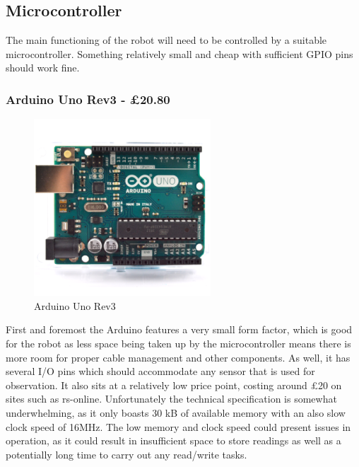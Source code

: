 				\subsection{Microcontroller}
				The main functioning of the robot will need to be controlled by a suitable microcontroller. Something relatively small and cheap with sufficient GPIO pins should work fine.
				
					\subsubsection{Arduino Uno Rev3 - \pounds{20.80}}
					\begin{figure}[h]
						\centering
						\includegraphics[width=.3\linewidth]{ANALYSIS/arduinounorev3.png}
						\caption{Arduino Uno Rev3}
						\label{fig:arduinounorev3}
					\end{figure}
					First and foremost the Arduino features a very small form factor, which is good for the robot as less space being taken up by the microcontroller means there is more room for proper cable management and other components. As well, it has several I/O pins which should accommodate any sensor that is used for observation. It also sits at a relatively low price point, costing around \pounds{20} on sites such as rs-online\cite{arduinounorev3}. Unfortunately the technical specification is somewhat underwhelming, as it only boasts 30 kB of available memory with an also slow clock speed of 16MHz\cite{arduinounorev3docs}. The low memory and clock speed could present issues in operation, as it could result in insufficient space to store readings as well as a potentially long time to carry out any read/write tasks.
				
